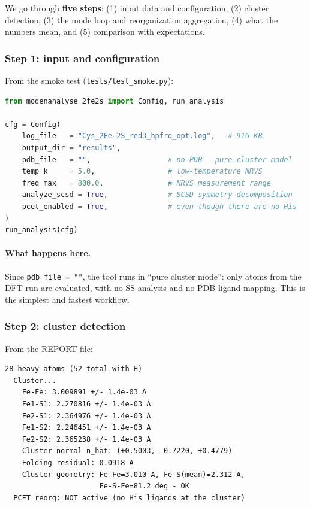 \documentclass[11pt,a4paper,twoside]{article}
\theoremstyle{remark}
\begin{document}
We go through \textbf{five steps}: (1) input data and
configuration, (2) cluster detection, (3) the mode loop and
reorganization aggregation, (4) what the numbers mean, and
(5) comparison with expectations.

\subsubsection*{Step 1: input and configuration}

From the smoke test (\texttt{tests/test\_smoke.py}):

\begin{lstlisting}[language=Python,basicstyle=\ttfamily\small]
from modenanalyse_2fe2s import Config, run_analysis

cfg = Config(
    log_file   = "Cys_2Fe-2S_red3_hpfrq_opt.log",   # 916 KB
    output_dir = "results",
    pdb_file   = "",                  # no PDB - pure cluster model
    temp_k     = 5.0,                 # low-temperature NRVS
    freq_max   = 800.0,               # NRVS measurement range
    analyze_scsd = True,              # SCSD symmetry decomposition
    pcet_enabled = True,              # even though there are no His
)
run_analysis(cfg)
\end{lstlisting}

\paragraph{What happens here.}
Since \texttt{pdb\_file = ""}, the tool runs in ``pure cluster
mode'': only atoms from the DFT run are evaluated, with no SS
analysis and no PDB-ligand mapping. This is the simplest and
fastest workflow.

\subsubsection*{Step 2: cluster detection}

From the REPORT file:
\begin{lstlisting}[basicstyle=\ttfamily\small]
  28 heavy atoms (52 total with H)
  Cluster...
    Fe-Fe: 3.009891 +/- 1.4e-03 A
    Fe1-S1: 2.270816 +/- 1.4e-03 A
    Fe2-S1: 2.364976 +/- 1.4e-03 A
    Fe1-S2: 2.246451 +/- 1.4e-03 A
    Fe2-S2: 2.365238 +/- 1.4e-03 A
    Cluster normal n_hat: (+0.5003, -0.7220, +0.4779)
    Folding residual: 0.0918 A
    Cluster geometry: Fe-Fe=3.010 A, Fe-S(mean)=2.312 A,
                      Fe-S-Fe=81.2 deg - OK
  PCET reorg: NOT active (no His ligands at the cluster)
\end{lstlisting}
\end{document}

